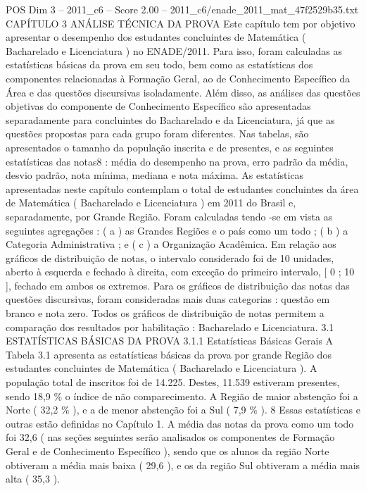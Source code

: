 \begin{textsample}{POS Dim 3 – 2011\_c6 – Score 2.00 – 2011\_c6/enade\_2011\_mat\_47f2529b35.txt}  \label{ex:f3_pos_203}
CAPÍTULO 3 ANÁLISE TÉCNICA DA PROVA Este capítulo tem por objetivo apresentar o desempenho dos estudantes concluintes de Matemática ( Bacharelado e Licenciatura ) no ENADE/2011.
Para isso, foram calculadas as estatísticas básicas da prova em seu todo, bem como as estatísticas dos componentes relacionadas à Formação Geral, ao de Conhecimento Específico da Área e das questões discursivas isoladamente.
Além disso, as análises das questões objetivas do componente de Conhecimento Específico são apresentadas separadamente para concluintes do Bacharelado e da Licenciatura, já que as questões propostas para cada grupo foram diferentes.
Nas tabelas, são apresentados o tamanho da população inscrita e de presentes, e as seguintes estatísticas das notas8 : média do desempenho na prova, erro padrão da média, desvio padrão, nota mínima, mediana e nota máxima.
As estatísticas apresentadas neste capítulo contemplam o total de estudantes concluintes da área de Matemática ( Bacharelado e Licenciatura ) em 2011 do Brasil e, separadamente, por Grande Região.
Foram calculadas tendo -se em vista as seguintes agregações : ( a ) as Grandes Regiões e o país como um todo ; ( b ) a Categoria Administrativa ; e ( c ) a Organização Acadêmica.
Em relação aos gráficos de distribuição de notas, o intervalo considerado foi de 10 unidades, aberto à esquerda e fechado à direita, com exceção do primeiro intervalo, [ 0 ; 10 ], fechado em ambos os extremos.
Para os gráficos de distribuição das notas das questões discursivas, foram consideradas mais duas categorias : questão em branco e nota zero.
Todos os gráficos de distribuição de notas permitem a comparação dos resultados por habilitação : Bacharelado e Licenciatura. 3.1 ESTATÍSTICAS BÁSICAS DA PROVA 3.1.1 Estatísticas Básicas Gerais A Tabela 3.1 apresenta as estatísticas básicas da prova por grande Região dos estudantes concluintes de Matemática ( Bacharelado e Licenciatura ).
A população total de inscritos foi de 14.225.
Destes, 11.539 estiveram presentes, sendo 18,9 \% o índice de não comparecimento.
A Região de maior abstenção foi a Norte ( 32,2 \% ), e a de menor abstenção foi a Sul ( 7,9 \% ). 8 Essas estatísticas e outras estão definidas no Capítulo 1.
A média das notas da prova como um todo foi 32,6 ( nas seções seguintes serão analisados os componentes de Formação Geral e de Conhecimento Específico ), sendo que os alunos da região Norte obtiveram a média mais baixa ( 29,6 ), e os da região Sul obtiveram a média mais alta ( 35,3 ).

\end{textsample}
